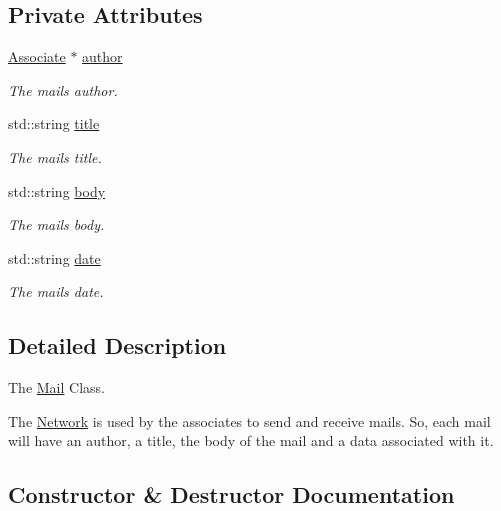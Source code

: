 \subsection*{Private Attributes}
\begin{DoxyCompactItemize}
\item 
\hyperlink{classAssociate}{Associate} $\ast$ \hyperlink{classMail_acfe110a866f8cc54120d4f4ab0f8321b}{author}
\begin{DoxyCompactList}\small\item\em The mail\textquotesingle{}s author. \end{DoxyCompactList}\item 
std\+::string \hyperlink{classMail_a2f54f71a529dec6345d84ae60562b207}{title}
\begin{DoxyCompactList}\small\item\em The mail\textquotesingle{}s title. \end{DoxyCompactList}\item 
std\+::string \hyperlink{classMail_aaa91a94ee92b2712218a9cae389554f7}{body}
\begin{DoxyCompactList}\small\item\em The mail\textquotesingle{}s body. \end{DoxyCompactList}\item 
std\+::string \hyperlink{classMail_aee9bc87682f6173b92bf135397f38162}{date}
\begin{DoxyCompactList}\small\item\em The mail\textquotesingle{}s date. \end{DoxyCompactList}\end{DoxyCompactItemize}


\subsection{Detailed Description}
The \hyperlink{classMail}{Mail} Class. 

The \hyperlink{classNetwork}{Network} is used by the associates to send and receive mails. So, each mail will have an author, a title, the body of the mail and a data associated with it. 

\subsection{Constructor \& Destructor Documentation}
\mbox{\label{classMail_acd3d916cd6a769cdaf6e91dbc2c85699}} 

